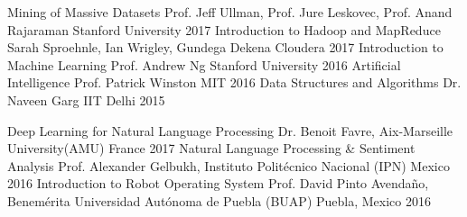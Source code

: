 \begin{cvhonors}
  \cvhonor
    {Mining of Massive Datasets}
    {Prof. Jeff Ullman, Prof. Jure Leskovec, Prof. Anand Rajaraman}
    {Stanford University}
    {2017}
  \cvhonor
    {Introduction to Hadoop and MapReduce}
    {Sarah Sproehnle, Ian Wrigley, Gundega Dekena}
    {Cloudera}
    {2017}
  \cvhonor
    {Introduction to Machine Learning}
    {Prof. Andrew Ng}
    {Stanford University}
    {2016}
  \cvhonor
    {Artificial Intelligence}
    {Prof. Patrick Winston}
    {MIT}
    {2016}
  \cvhonor
    {Data Structures and Algorithms}
    {Dr. Naveen Garg}
    {IIT Delhi}
    {2015}

\end{cvhonors}

\begin{cvhonors}
  \cvhonor
    {Deep Learning for Natural Language Processing}
    {Dr. Benoit Favre, Aix-Marseille University(AMU)}
    {France}
    {2017}
  \cvhonor
    {Natural Language Processing \& Sentiment Analysis}
    {Prof. Alexander Gelbukh, Instituto Politécnico Nacional (IPN)}
    {Mexico}
    {2016}
  \cvhonor
    {Introduction to Robot Operating System}
    {Prof. David Pinto Avendaño, Benemérita Universidad Autónoma de Puebla (BUAP)}
    {Puebla, Mexico}
    {2016}
\end{cvhonors}

